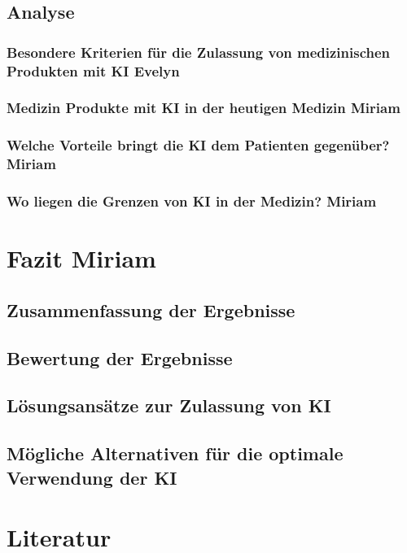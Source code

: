 \documentclass[a4paper, 11pt]{article}
\begin{document}
		\subsection{Analyse}
			\subsubsection{Besondere Kriterien für die Zulassung von medizinischen Produkten mit KI \small{Evelyn}}\label{sec:special-criteria}
				
			\subsubsection{Medizin Produkte mit KI in der heutigen Medizin \small{Miriam}}\label{sec:ki-today}
				
			\subsubsection{Welche Vorteile bringt die KI dem Patienten gegenüber? \small{Miriam}}\label{sec:ki-advantages}
				
			\subsubsection{Wo liegen die Grenzen von KI in der Medizin? \small{Miriam}}\label{sec:ki-limitations}
				
	
	\newpage
	\section{Fazit \small{Miriam}}\label{sec:conclusion}
		
		\subsection{Zusammenfassung der Ergebnisse}\label{sec:summary}
			
		\subsection{Bewertung der Ergebnisse}\label{sec:rating}
			
		\subsection{Lösungsansätze zur Zulassung von KI}\label{sec:solutions}
			
		\subsection{Mögliche Alternativen für die optimale Verwendung der KI}\label{sec:alternatives}
			
	  

    \newpage
    \printglossary[type=\acronymtype,title={Akronyme}]
   
    \newpage
    \section*{Literatur}
    \nocite{*}
    \printbibliography{}
	
    \newpage
    \printglossary[type=main,title={Glossar}]
\end{document}
